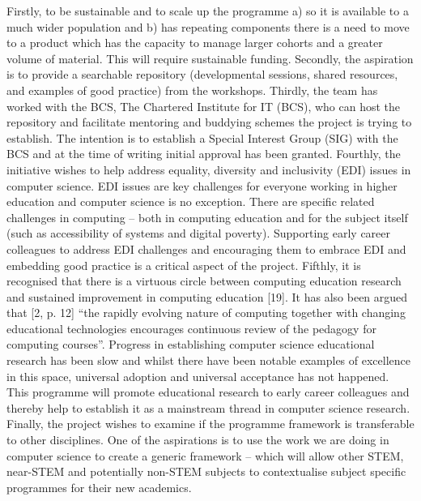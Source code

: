 \documentclass[sigconf]{acmart}
\begin{document}
Firstly, to be sustainable and to scale up the programme a) so it is available to a much wider population and b) has repeating components there is a need to move to a product which has the capacity to manage larger cohorts and a greater volume of material. This will require sustainable funding. Secondly, the aspiration is to provide a searchable repository (developmental sessions, shared resources, and examples of good practice) from the workshops. Thirdly, the team has worked with the BCS, The Chartered Institute for IT (BCS), who can host the repository and facilitate mentoring and buddying schemes the project is trying to establish. The intention is to establish a Special Interest Group (SIG) with the BCS \cite{BCSSIG} and at the time of writing initial approval has been granted. Fourthly, the initiative wishes to help address equality, diversity and inclusivity (EDI) issues in computer science. EDI issues are key challenges for everyone working in higher education and computer science is no exception. There are specific related challenges in computing – both in computing education and for the subject itself (such as accessibility of systems and digital poverty). Supporting early career colleagues to address EDI challenges and encouraging them to embrace EDI and embedding good practice is a critical aspect of the project. Fifthly, it is recognised that there is a virtuous circle between computing education research and sustained improvement in computing education [19]. It has also been argued that [2, p. 12] “the rapidly evolving nature of computing together with changing educational technologies encourages continuous review of the pedagogy for computing courses”. Progress in establishing computer science educational research has been slow and whilst there have been notable examples of excellence in this space, universal adoption and universal acceptance has not happened. This programme will promote educational research to early career colleagues and thereby help to establish it as a mainstream thread in computer science research. Finally, the project wishes to examine if the programme framework is transferable to other disciplines. One of the aspirations is to use the work we are doing in computer science to create a generic framework – which will allow other STEM, near-STEM and potentially non-STEM subjects to contextualise subject specific programmes for their new academics.
\end{document}
